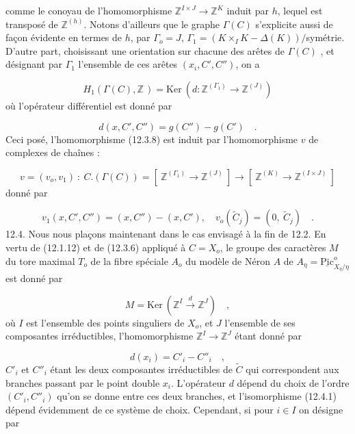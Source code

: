 comme le conoyau de l'homomorphisme $\mathbb{Z}^{I \times J} \longrightarrow \mathbb{Z}^{K}$ induit par $h$, lequel est transposé de $\mathbb{Z}^{(h)}$. Notons d'ailleurs que le graphe $\Gamma(C)$ s'explicite aussi de façon évidente en termes de $h$, par $\Gamma_o = J$, $\Gamma_1 = (K \times_I K - \Delta(K))/$symétrie. D'autre part, choisissant une orientation sur chacune des arêtes de $\Gamma(C)$ , et désignant par $\Gamma_1$ l'ensemble de ces arêtes $(x_i,C',C'')$, on a

\begin{equation}\tag{12.3.11}
H_1(\Gamma(C),\mathbb{Z}\,) = \mathrm{Ker}\ (d : \mathbb{Z}^{(\Gamma_1)} \longrightarrow \mathbb{Z}^{(J)})
\end{equation}
où l'opérateur différentiel est donné par

\begin{equation}\tag{12.3.12}
d(x,C',C'') = g(C'') - g(C') \quad .
\end{equation}
Ceci posé, l'homomorphisme (12.3.8) est induit par l'homomorphisme $v$ de complexes de chaînes :

\begin{equation}\tag{12.3.13}
v = (v_o,v_1) \ : \ C.(\Gamma(C)) = \left[\ \mathbb{Z}^{(\Gamma_1)} \longrightarrow \mathbb{Z}^{(J)}\ \right] \to \left[\ \mathbb{Z}^{(K)} \to \mathbb{Z}^{(I \times J)}\ \right]
\end{equation}
donné par

\begin{equation}\tag{12.3.14}
v_1(x,C',C'') = (x,C'') - (x,C'), \quad v_o(\widetilde{C}_j) = (0,\ \widetilde{C}_j) \quad .
\end{equation}
12.4. Nous nous plaçons maintenant dans le cas envisagé à la fin de 12.2. En vertu de (12.1.12) et de (12.3.6) appliqué à $C = X_o$, le groupe des caractères $M$ du tore maximal $T_o$ de la fibre spéciale $A_o$ du modèle de Néron $A$ de $A_\eta = \underline{\mathrm{Pic}}^{o}_{X_\eta/\eta}$ est donné par

\begin{equation}\tag{12.4.1}
M = \mathrm{Ker}\ (\mathbb{Z}^{I} \xrightarrow{\ d\ } \mathbb{Z}^{J}) \quad ,
\end{equation}
où $I$ est l'ensemble des points singuliers de $X_o$, et $J$ l'ensemble de ses composantes irréductibles, l'homomorphisme $\mathbb{Z}^{I} \longrightarrow \mathbb{Z}^{J}$ étant donné par



\begin{equation}\tag{12.4.2}
d(x_i) = C'_i - C''_i \quad ,
\end{equation}
$C'_i$ et $C''_i$ étant les deux composantes irréductibles de $\widetilde{C}$ qui correspondent aux branches passant par le point double $x_i$. L'opérateur $d$ dépend du choix de l'ordre $(C'_i,C''_i)$ qu'on se donne entre ces deux branches, et l'isomorphisme (12.4.1) dépend évidemment de ce système de choix. Cependant, si pour $i \in I$ on désigne par

